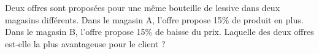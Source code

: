 
Deux offres sont proposées pour une même bouteille de lessive dans deux magasins différents. Dans le magasin A, l'offre propose 15\% de produit en plus. Dans le magasin B, l'offre propose 15\% de baisse du prix. Laquelle des deux offres est-elle la plus avantageuse pour le client ? 